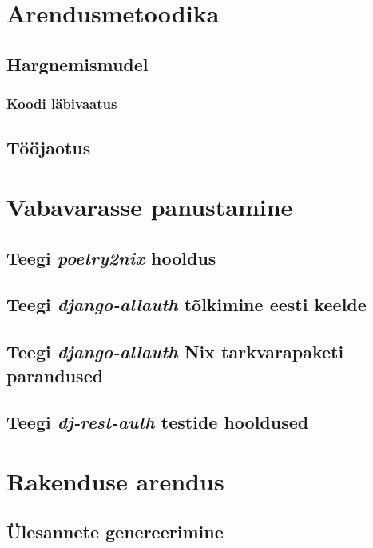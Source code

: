 \section{Arendusmetoodika}

\subsection{Hargnemismudel}

\subsubsection{Koodi läbivaatus}

\subsection{Tööjaotus}


\section{Vabavarasse panustamine}

\subsection{Teegi \textit{poetry2nix} hooldus}

\subsection{Teegi \textit{django-allauth} tõlkimine eesti keelde}

\subsection{Teegi \textit{django-allauth} Nix tarkvarapaketi parandused}

\subsection{Teegi \textit{dj-rest-auth} testide hooldused}


\section{Rakenduse arendus}

\subsection{Ülesannete genereerimine}

